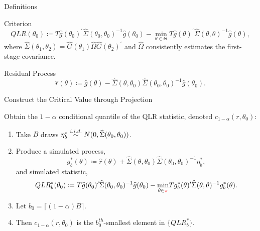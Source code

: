 \documentclass[smaller, aspectratio=169]{beamer}
\newcommand*{\rpi}{\textcolor{red}{\pi}}
\begin{document}
\begin{frame}[c]{Definitions}

    \begin{block}{Criterion}
        \begin{equation*}
          QLR(\theta_{0}) \coloneqq T \widehat{g} (\theta_{0})^{\prime}\widehat{\Sigma} (\theta_{0}, \theta_{0})^{-1}\widehat{g}(\theta_{0})-\underset{\theta \in \Theta}{\min}T\widehat{g}(\theta)^{\prime}\widehat{\Sigma} (\theta, \theta)^{-1}\widehat{g}(\theta),  
        \end{equation*}
        \quad where $\widehat{\Sigma}\left(\theta_{1}, \theta_{2}\right) = \widehat{G}(\theta_{1})\widehat{\Omega}\widehat{G}(\theta_{2})^{\prime}$ and $\widehat{\Omega}$ consistently estimates the first-stage covariance.
    \end{block}
 
    \vfill
    \pause
%
    \begin{block}{Residual Process}
        \begin{equation*}
          \widehat{r}(\theta) \coloneqq \widehat{g}(\theta)-\widehat{\Sigma}(\theta, \theta_{0})\widehat{\Sigma}(\theta_{0}, \theta_{0})^{-1}\widehat{g} (\theta_{0}). 
        \end{equation*}
    \end{block}

\end{frame}

\begin{frame}[c]{Construct the Critical Value through Projection}

Obtain the $1-\alpha $ conditional quantile of the QLR statistic, denoted $c_{1-\alpha }(r,\theta_{0})$: 
\bigskip

\begin{enumerate}
    \item Take $B$ draws $\eta_{b}^{\ast} \overset{i.i.d.}{\sim} N(0,\widehat{\Sigma}(\theta_{0},\theta_{0}))$. 
%
        \medskip
%
    \item Produce a simulated process, 
%
        \begin{equation*}
            g_{b}^{\ast}(\theta) \coloneqq \widehat{r}(\theta) + \widehat{\Sigma}(\theta, \theta_{0}) \widehat{\Sigma}(\theta_{0},\theta_{0})^{-1}\eta_{b}^{\ast},
        \end{equation*}
%
        and simulated statistic,
%
        \begin{equation*}
            QLR_{b}^{\ast}(\theta_{0}) \coloneqq T\widehat{g}(\theta_{0})^{\prime}\widehat{\Sigma}(\theta_{0},\theta_{0})^{-1}\widehat{g}(\theta_{0})-\underset{\theta \in \rpi}{\min}Tg_{b}^{\ast}(\theta)^{\prime}\widehat{\Sigma} (\theta ,\theta)^{-1}g_{b}^{\ast}(\theta).
        \end{equation*}
%
        \item  Let $b_{0}=\lceil (1-\alpha) B \rceil$. 
        \medskip
%
        \item Then $c_{1 - \alpha}(r, \theta_{0})$ is the $b_{0}^{th}$-smallest element in $\lbrace QLR_{b}^{\ast} \rbrace$.
    \end{enumerate}

\end{frame}
\end{document}
